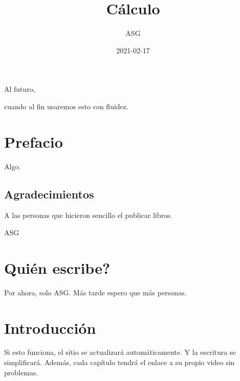 \documentclass[
]{krantz}
\title{Cálculo}
\author{ASG}
\date{2021-02-17}
\theoremstyle{definition}
\theoremstyle{definition}
\theoremstyle{definition}
\theoremstyle{definition}
\theoremstyle{remark}
\begin{document}
\maketitle


\thispagestyle{empty}

\begin{center}
Al futuro,

cuando al fin usaremos esto con fluidez.
\end{center}

\setlength{\abovedisplayskip}{-5pt}
\setlength{\abovedisplayshortskip}{-5pt}

{
\hypersetup{linkcolor=}
\setcounter{tocdepth}{2}
\tableofcontents
}
\listoftables
\listoffigures
\hypertarget{prefacio}{%
\chapter*{Prefacio}\label{prefacio}}


Algo.

\hypertarget{agradecimientos}{%
\section*{Agradecimientos}\label{agradecimientos}}


A las personas que hicieron sencillo el publicar libros.

\begin{flushright}
ASG
\end{flushright}

\hypertarget{quiuxe9n-escribe}{%
\chapter{Quién escribe?}\label{quiuxe9n-escribe}}

Por ahora, solo ASG. Más tarde espero que más personas.

\mainmatter

\hypertarget{introducciuxf3n}{%
\chapter{Introducción}\label{introducciuxf3n}}

Si esto funciona, el sitio se actualizará automáticamente. Y la escritura se simplificará. Además, cada capítulo tendrá el enlace a su propio video sin problemas.
\end{document}
